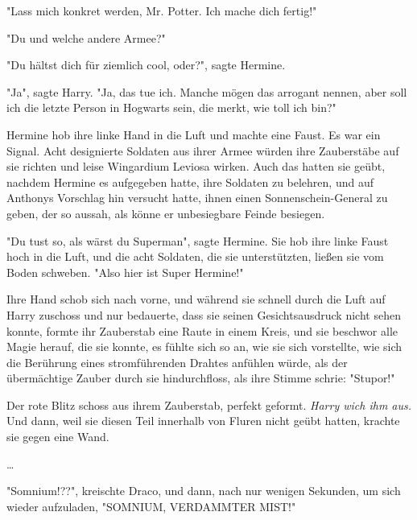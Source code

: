 {"Lass mich konkret werden, Mr. Potter. Ich mache dich fertig!"

"Du und welche andere Armee?"

"Du hältst dich für ziemlich cool, oder?", sagte Hermine.

"Ja", sagte Harry. "Ja, das tue ich. Manche mögen das arrogant nennen, aber soll ich die letzte Person in Hogwarts sein, die merkt, wie toll ich bin?"

Hermine hob ihre linke Hand in die Luft und machte eine Faust. Es war ein Signal. Acht designierte Soldaten aus ihrer Armee würden ihre Zauberstäbe auf sie richten und leise Wingardium Leviosa wirken. Auch das hatten sie geübt, nachdem Hermine es aufgegeben hatte, ihre Soldaten zu belehren, und auf Anthonys Vorschlag hin versucht hatte, ihnen einen Sonnenschein-General zu geben, der so aussah, als könne er unbesiegbare Feinde besiegen.

"Du tust so, als wärst du Superman", sagte Hermine. Sie hob ihre linke Faust hoch in die Luft, und die acht Soldaten, die sie unterstützten, ließen sie vom Boden schweben. "Also hier ist Super Hermine!"

Ihre Hand schob sich nach vorne, und während sie schnell durch die Luft auf Harry zuschoss und nur bedauerte, dass sie seinen Gesichtsausdruck nicht sehen konnte, formte ihr Zauberstab eine Raute in einem Kreis, und sie beschwor alle Magie herauf, die sie konnte, es fühlte sich so an, wie sie sich vorstellte, wie sich die Berührung eines stromführenden Drahtes anfühlen würde, als der übermächtige Zauber durch sie hindurchfloss, als ihre Stimme schrie: "Stupor!"

Der rote Blitz schoss aus ihrem Zauberstab, perfekt geformt. \emph{Harry wich ihm aus.} Und dann, weil sie diesen Teil innerhalb von Fluren nicht geübt hatten, krachte sie gegen eine Wand.

…

"Somnium!??", kreischte Draco, und dann, nach nur wenigen Sekunden, um sich wieder aufzuladen, "SOMNIUM, VERDAMMTER MIST!"

}
